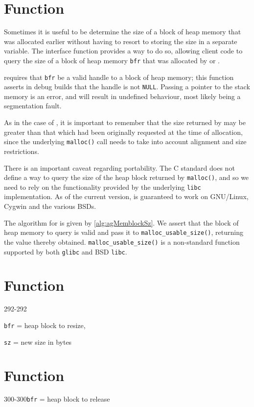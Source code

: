 %
%
\section{Function \agMemblockSz}
\label{sec:agMemblockSz}


Sometimes it is useful to be determine the size of a block of heap memory that
was allocated earlier without having to resort to storing the size in a separate
variable. The interface function \agMemblockSz provides a way to do so, allowing
client code to query the size of a block of heap memory \verb|bfr| that was 
allocated by \agMemblockNew or \agMemblockCopy. 

\agMemblockSz requires that \verb|bfr| be a valid handle to a block of heap 
memory; this function asserts in debug builds that the handle is not 
\verb|NULL|. Passing a pointer to the stack memory is an error, and will result 
in undefined behaviour, most likely being a segmentation fault.

As in the case of \agMemblockNew, it is important to remember that the size
returned by \agMemblockSz may be greater than that which had been originally
requested at the time of allocation, since the underlying \verb|malloc()| call
needs to take into account alignment and size restrictions.


There is an important caveat regarding portability. The C standard does not
define a way to query the size of the heap block returned by \verb|malloc()|,
and so we need to rely on the functionality provided by the underlying
\verb|libc| implementation. As of the current version, \agMemblockSz is
guaranteed to work on GNU/Linux, Cygwin and the various BSDs.

The algorithm for \agMemblockSz is given by \ref{alg:agMemblockSz}. We assert
that the block of heap memory to query is valid and pass it to
\verb|malloc_usable_size()|, returning the value thereby obtained.
\verb|malloc_usable_size()| is a non-standard function supported by both
\verb|glibc| and BSD \verb|libc|.


%
%
\section{Function \agMemblockResize}
  {292-292}{\texttt{bfr} = heap block to resize,\par\texttt{sz} = new size in
  bytes}
\kant[1]


%
%
\section{Function \agMemblockFree}
  {300-300}{\texttt{bfr} = heap block to release}
\kant[1]

